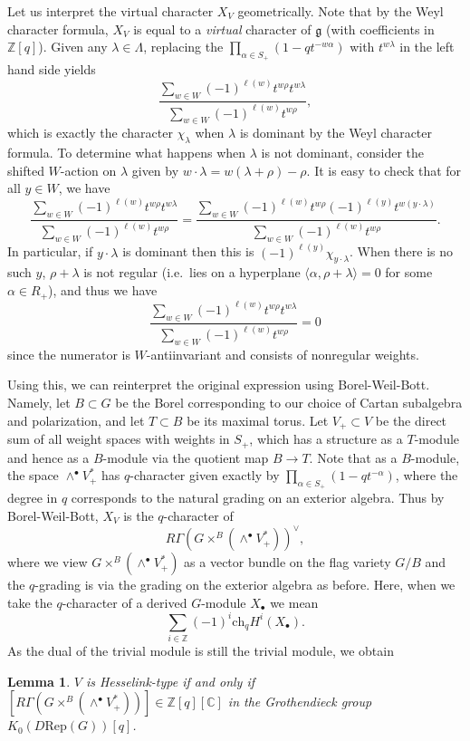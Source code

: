 \documentclass[12pt]{article}
\newcommand{\Z}{\mathbb{Z}}
\newcommand{\C}{\mathbb{C}}
\newtheorem{lemma}[theorem]{Lemma}
\theoremstyle{definition}
\theoremstyle{remark}
\newcommand{\g}{\mathfrak{g}}
\newcommand{\ch}{\mathrm{ch}}
\begin{document}
Let us interpret the virtual character $X_V$ geometrically. Note that by the Weyl character formula, $X_V$ is equal to a \emph{virtual} character of $\g$ (with coefficients in $\Z[q]$). Given any $\lambda\in\Lambda$, replacing the $\prod_{\alpha\in S_+}(1-qt^{-w\alpha})$ with $t^{w\lambda}$ in the left hand side yields
\[\frac{\sum_{w\in W}(-1)^{\ell(w)}t^{w\rho}t^{w\lambda}}{\sum_{w\in W}(-1)^{\ell(w)}t^{w\rho}},\]
which is exactly the character $\chi_\lambda$ when $\lambda$ is dominant by the Weyl character formula. To determine what happens when $\lambda$ is not dominant, consider the shifted $W$-action on $\lambda$ given by $w\cdot\lambda=w(\lambda+\rho)-\rho$. It is easy to check that for all $y\in W$, we have
\[\frac{\sum_{w\in W}(-1)^{\ell(w)}t^{w\rho}t^{w\lambda}}{\sum_{w\in W}(-1)^{\ell(w)}t^{w\rho}}=\frac{\sum_{w\in W}(-1)^{\ell(w)}t^{w\rho}(-1)^{\ell(y)}t^{w(y\cdot\lambda)}}{\sum_{w\in W}(-1)^{\ell(w)}t^{w\rho}}.\]
In particular, if $y\cdot\lambda$ is dominant then this is $(-1)^{\ell(y)}\chi_{y\cdot\lambda}$. When there is no such $y$, $\rho+\lambda$ is not regular (i.e.~lies on a hyperplane $\langle\alpha,\rho+\lambda\rangle=0$ for some $\alpha\in R_+$), and thus we have
\[\frac{\sum_{w\in W}(-1)^{\ell(w)}t^{w\rho}t^{w\lambda}}{\sum_{w\in W}(-1)^{\ell(w)}t^{w\rho}}=0\]
since the numerator is $W$-antiinvariant and consists of nonregular weights. 

Using this, we can reinterpret the original expression using Borel-Weil-Bott. Namely, let $B\subset G$ be the Borel corresponding to our choice of Cartan subalgebra and polarization, and let $T\subset B$ be its maximal torus. Let $V_+\subset V$ be the direct sum of all weight spaces with weights in $S_+$, which has a structure as a $T$-module and hence as a $B$-module via the quotient map $B\to T$. Note that as a $B$-module, the space $\wedge^\bullet V_+^*$ has $q$-character given exactly by $\prod_{\alpha\in S_+}(1-qt^{-\alpha})$, where the degree in $q$ corresponds to the natural grading on an exterior algebra. Thus by Borel-Weil-Bott, $X_V$ is the $q$-character of
\[R\Gamma(G\times^B(\wedge^\bullet V_+^*))^\vee,\]
where we view $G\times^B(\wedge^\bullet V_+^*)$ as a vector bundle on the flag variety $G/B$ and the $q$-grading is via the grading on the exterior algebra as before. Here, when we take the $q$-character of a derived $G$-module $X_\bullet$ we mean
\[\sum_{i\in\Z}(-1)^i\ch_qH^i(X_\bullet).\]
As the dual of the trivial module is still the trivial module, we obtain
\begin{lemma}
    $V$ is Hesselink-type if and only if $[R\Gamma(G\times^B(\wedge^\bullet V_+^*))]\in\Z[q][\C]$ in the Grothendieck group $K_0(D\mathrm{Rep}(G))[q]$.
\end{lemma}
\end{document}
